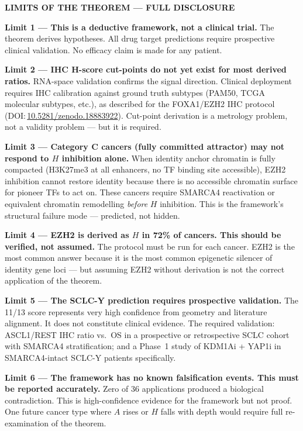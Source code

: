 \documentclass[11pt, a4paper]{article}
\begin{document}
\begin{limitenv}
\textbf{LIMITS OF THE THEOREM --- FULL DISCLOSURE}

\medskip
\textbf{Limit 1 --- This is a deductive framework,
not a clinical trial.}
The theorem derives hypotheses. All drug target
predictions require prospective clinical validation.
No efficacy claim is made for any patient.

\medskip
\textbf{Limit 2 --- IHC H-score cut-points do not
yet exist for most derived ratios.}
RNA-space validation confirms the signal direction.
Clinical deployment requires IHC calibration against
ground truth subtypes (PAM50, TCGA molecular
subtypes, etc.), as described for the FOXA1/EZH2
IHC protocol
(DOI:\,\href{https://doi.org/10.5281/zenodo.18883922}{10.5281/zenodo.18883922}).
Cut-point derivation is a metrology problem,
not a validity problem --- but it is required.

\medskip
\textbf{Limit 3 --- Category C cancers (fully
committed attractor) may not respond to $H$
inhibition alone.}
When identity anchor chromatin is fully compacted
(H3K27me3 at all enhancers, no TF binding site
accessible), EZH2 inhibition cannot restore identity
because there is no accessible chromatin surface
for pioneer TFs to act on. These cancers require
SMARCA4 reactivation or equivalent chromatin
remodelling \emph{before} $H$ inhibition.
This is the framework's structural failure mode ---
predicted, not hidden.

\medskip
\textbf{Limit 4 --- EZH2 is derived as $H$ in 72\%
of cancers. This should be verified, not assumed.}
The protocol must be run for each cancer. EZH2 is
the most common answer because it is the most common
epigenetic silencer of identity gene loci --- but
assuming EZH2 without derivation is not the correct
application of the theorem.

\medskip
\textbf{Limit 5 --- The SCLC-Y prediction requires
prospective validation.}
The 11/13 score represents very high confidence
from geometry and literature alignment. It does not
constitute clinical evidence. The required validation:
ASCL1/REST IHC ratio vs.\ OS in a prospective or
retrospective SCLC cohort with SMARCA4 stratification;
and a Phase~1 study of KDM1Ai + YAP1i in
SMARCA4-intact SCLC-Y patients specifically.

\medskip
\textbf{Limit 6 --- The framework has no known
falsification events. This must be reported
accurately.}
Zero of 36 applications produced a biological
contradiction. This is high-confidence evidence for
the framework but not proof. One future cancer type
where $A$ rises or $H$ falls with depth would require
full re-examination of the theorem.
\end{limitenv}
\end{document}
